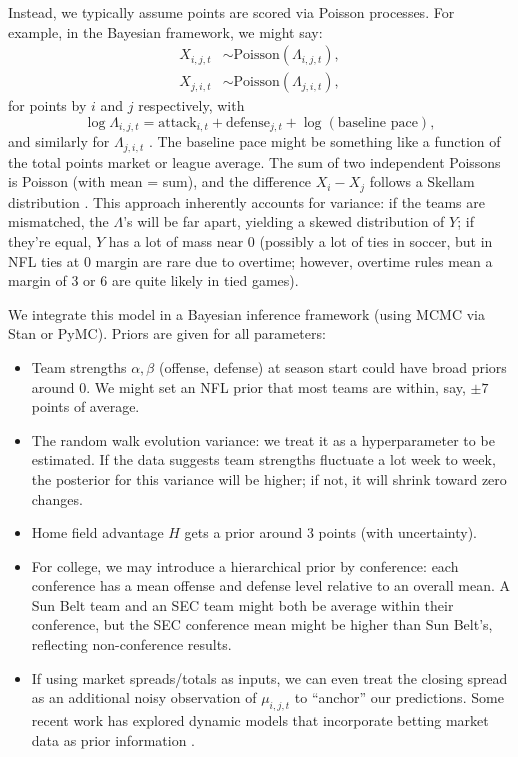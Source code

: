 \documentclass[12pt]{article}
\begin{document}
Instead, we typically assume points are scored via Poisson processes. For example, in the Bayesian framework, we might say:
\begin{align*}
X_{i,j,t} &\sim \text{Poisson}(\Lambda_{i,j,t}), \\
X_{j,i,t} &\sim \text{Poisson}(\Lambda_{j,i,t}),
\end{align*}
for points by $i$ and $j$ respectively, with 
\[
\log \Lambda_{i,j,t} = \text{attack}_{i,t} + \text{defense}_{j,t} + \log(\text{baseline pace}),
\] 
and similarly for $\Lambda_{j,i,t}$ \cite{Egidi2018}. The baseline pace might be something like a function of the total points market or league average. The sum of two independent Poissons is Poisson (with mean = sum), and the difference $X_{i}-X_{j}$ follows a Skellam distribution \cite{Karlis2009}. This approach inherently accounts for variance: if the teams are mismatched, the $\Lambda$'s will be far apart, yielding a skewed distribution of $Y$; if they're equal, $Y$ has a lot of mass near 0 (possibly a lot of ties in soccer, but in NFL ties at 0 margin are rare due to overtime; however, overtime rules mean a margin of 3 or 6 are quite likely in tied games).

We integrate this model in a Bayesian inference framework (using MCMC via Stan or PyMC). Priors are given for all parameters:
\begin{itemize}
    \item Team strengths $\alpha, \beta$ (offense, defense) at season start could have broad priors around 0. We might set an NFL prior that most teams are within, say, $\pm 7$ points of average.
    \item The random walk evolution variance: we treat it as a hyperparameter to be estimated. If the data suggests team strengths fluctuate a lot week to week, the posterior for this variance will be higher; if not, it will shrink toward zero changes.
    \item Home field advantage $H$ gets a prior around 3 points (with uncertainty).
    \item For college, we may introduce a hierarchical prior by conference: each conference has a mean offense and defense level relative to an overall mean. A Sun Belt team and an SEC team might both be average within their conference, but the SEC conference mean might be higher than Sun Belt's, reflecting non-conference results.
    \item If using market spreads/totals as inputs, we can even treat the closing spread as an additional noisy observation of $\mu_{i,j,t}$ to “anchor” our predictions. Some recent work has explored dynamic models that incorporate betting market data as prior information \cite{Egidi2018}.
\end{itemize}
\end{document}
